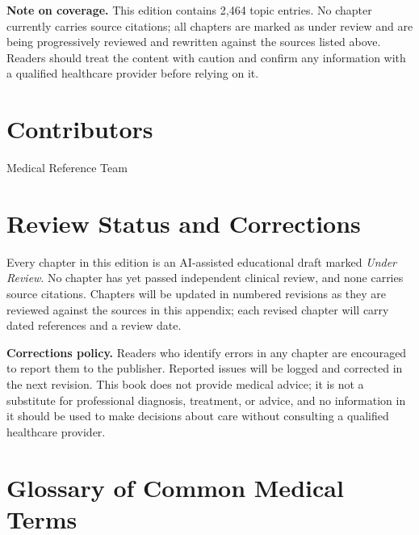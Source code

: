 \documentclass[12pt,oneside]{book}
\begin{document}
\medskip
\noindent\textbf{Note on coverage.} This edition contains 2,464 topic entries. No chapter currently carries source citations; all chapters are marked as under review and are being progressively reviewed and rewritten against the sources listed above. Readers should treat the content with caution and confirm any information with a qualified healthcare provider before relying on it.

\section*{Contributors}
Medical Reference Team

\section*{Review Status and Corrections}
Every chapter in this edition is an AI-assisted educational draft marked \emph{Under Review}. No chapter has yet passed independent clinical review, and none carries source citations. Chapters will be updated in numbered revisions as they are reviewed against the sources in this appendix; each revised chapter will carry dated references and a review date.

\medskip
\noindent\textbf{Corrections policy.} Readers who identify errors in any chapter are encouraged to report them to the publisher. Reported issues will be logged and corrected in the next revision. This book does not provide medical advice; it is not a substitute for professional diagnosis, treatment, or advice, and no information in it should be used to make decisions about care without consulting a qualified healthcare provider.

\section*{Glossary of Common Medical Terms}
\end{document}
